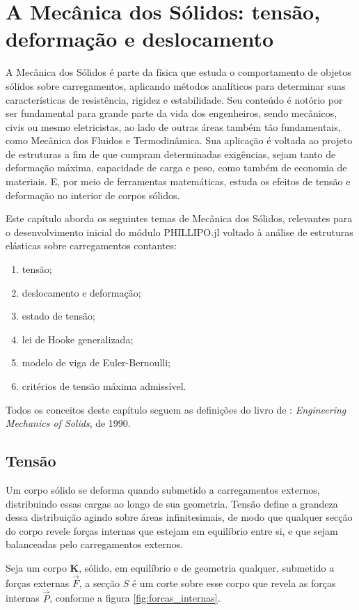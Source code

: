 \chapter{A Mecânica dos Sólidos: tensão, deformação e deslocamento}

A Mecânica dos Sólidos é parte da física que estuda o comportamento de objetos sólidos sobre carregamentos, aplicando métodos analíticos para determinar suas características de resistência, rigidez e estabilidade. Seu conteúdo é notório por ser fundamental para grande parte da vida dos engenheiros, sendo mecânicos, civis ou mesmo eletricistas, ao lado de outras áreas também tão fundamentais, como Mecânica dos Fluidos e Termodinâmica. Sua aplicação é voltada ao projeto de estruturas a fim de que cumpram determinadas exigências, sejam tanto de deformação máxima, capacidade de carga e peso, como também de economia de materiais. E, por meio de ferramentas matemáticas, estuda os efeitos de tensão e deformação no interior de corpos sólidos. \cite{popov}

Este capítulo aborda os seguintes temas de Mecânica dos Sólidos, relevantes para o desenvolvimento inicial do módulo PHILLIPO.jl voltado à análise de estruturas elásticas sobre carregamentos contantes:
\begin{enumerate}
    \item tensão;
    \item deslocamento e deformação;
    \item estado de tensão;
    \item lei de Hooke generalizada;
    \item modelo de viga de Euler-Bernoulli;
    \item critérios de tensão máxima admissível.
\end{enumerate}

Todos os conceitos deste capítulo seguem as definições do livro de \citeauthor{popov}: \emph{Engineering Mechanics of Solids}, de 1990.

\section{Tensão}

Um corpo sólido se deforma quando submetido a carregamentos externos, distribuindo essas cargas ao longo de sua geometria. Tensão define a grandeza dessa distribuição agindo sobre áreas infinitesimais, de modo que qualquer secção do corpo revele forças internas que estejam em equilíbrio entre si, e que sejam balanceadas pelo carregamentos externos. \cite{popov}

Seja um corpo $\bm{K}$, sólido, em equilíbrio e de geometria qualquer, submetido a forças externas $\vec{F}$, a secção $S$ é um corte sobre esse corpo que revela as forças internas $\vec{P}$, conforme a figura \ref{fig:forcas_internas}.


